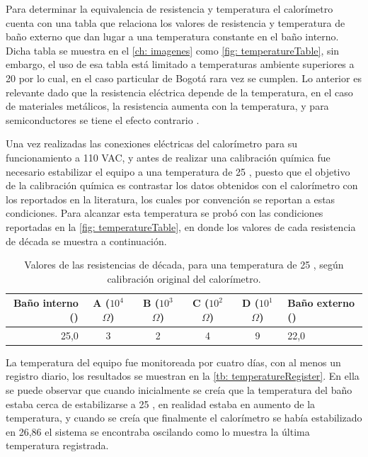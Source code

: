 	Para determinar la equivalencia de resistencia y temperatura el calorímetro cuenta con una tabla que relaciona los valores de resistencia y temperatura de ba\~no externo que dan lugar a una temperatura constante en el ba\~no interno. Dicha tabla se muestra en el \autoref{ch: imagenes} como \autoref{fig: temperatureTable}, sin embargo, el uso de esa tabla est\'a limitado a temperaturas ambiente superiores a 20 \grad{} por lo cual, en el caso particular de Bogot\'a rara vez se cumplen. Lo anterior es relevante dado que la resistencia el\'ectrica depende de la temperatura, en el caso de materiales met\'alicos, la resistencia aumenta con la temperatura, y para semiconductores se tiene el efecto contrario \cite{simon2013oxford}.
	
	Una vez realizadas las conexiones el\'ectricas del calor\'imetro para su funcionamiento a 110 VAC, y antes de realizar una calibraci\'on qu\'imica fue necesario estabilizar el equipo a una temperatura de 25 \grad{}, puesto que el objetivo de la calibraci\'on qu\'imica es contrastar los datos obtenidos con el calor\'imetro con los reportados en la literatura, los cuales por convenci\'on se reportan a estas condiciones. Para alcanzar esta temperatura se probó con las condiciones reportadas en la \autoref{fig: temperatureTable}, en donde los valores de cada resistencia de década se muestra a continuación. 
	\begin{table}[h]
		\centering
		\caption{Valores de las resistencias de década, para una temperatura de 25 \grad{}, seg\'un calibración original del calorímetro.}
		\begin{tabular}{r|cccc|l}
			\hline
			\textbf{Baño interno (\grad{})} & A ($10^4$ $\Omega$) & B ($10^3$ $\Omega$) & C ($10^2$ $\Omega$) & D ($10^1$ $\Omega$) & \textbf{Baño externo (\grad{})} \\
			\hline
			25,0 & 3 & 2 & 4 & 9 & 22,0 \\
			\hline
		\end{tabular}
		\label{tb: decadeResistorsBefore}
	\end{table}
	
	La temperatura del equipo fue monitoreada por cuatro días, con al menos un registro diario, los resultados se muestran en la \autoref{tb: temperatureRegister}. En ella se puede observar que cuando inicialmente se creía que la temperatura del baño estaba cerca de estabilizarse a 25 \grad{}, en realidad estaba en aumento de la temperatura, y cuando se creía que finalmente el calorímetro se había estabilizado en 26,86 \grad{} el sistema se encontraba oscilando como lo muestra la última temperatura registrada.
	
